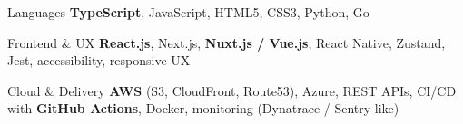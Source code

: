 
\begin{cvskills}

  \cvskill
  {Languages}
  {\textbf{TypeScript}, JavaScript, HTML5, CSS3, Python, Go}

  \cvskill
  {Frontend \& UX}
  {\textbf{React.js}, Next.js, \textbf{Nuxt.js / Vue.js}, React Native, Zustand, Jest, accessibility, responsive UX}

  \cvskill
  {Cloud \& Delivery}
  {\textbf{AWS} (S3, CloudFront, Route53), Azure, REST APIs, CI/CD with \textbf{GitHub Actions}, Docker, monitoring (Dynatrace / Sentry-like)}

\end{cvskills}
